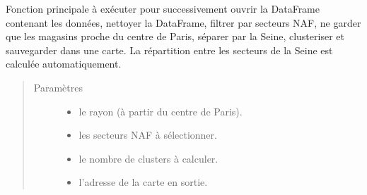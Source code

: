 \documentclass[letterpaper,10pt,french]{sphinxmanual}
\begin{document}

\begin{fulllineitems}
\label{\detokenize{index:src.clusterizer.clusterizer.main_json}}
\sphinxAtStartPar
Fonction principale à exécuter pour successivement ouvrir la DataFrame contenant les données,
nettoyer la DataFrame, filtrer par secteurs NAF, ne garder que les magasins proche du centre de Paris,
séparer par la Seine, clusteriser et sauvegarder dans une carte.
La répartition entre les secteurs de la Seine est calculée automatiquement.
\begin{quote}\begin{description}
\item[{Paramètres}] \leavevmode\begin{itemize}
\item {} 
\sphinxAtStartPar
{} \textendash{} le rayon (à partir du centre de Paris).

\item {} 
\sphinxAtStartPar
{} \textendash{} les secteurs NAF à sélectionner.

\item {} 
\sphinxAtStartPar
{} \textendash{} le nombre de clusters à calculer.

\item {} 
\sphinxAtStartPar
{} \textendash{} l’adresse de la carte en sortie.


\end{itemize}
\end{description}
\end{quote}
\end{fulllineitems}
\end{document}
